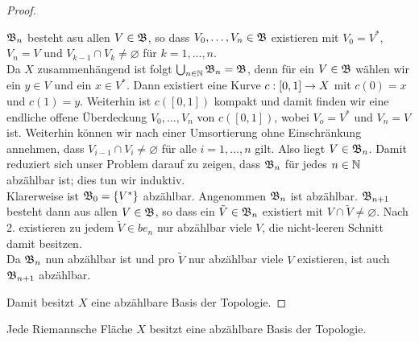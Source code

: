 \begin{proof}
\begin{enumerate}
    $\mathfrak{B}_n$ besteht asu allen $V \in \mathfrak{B}$, so dass $V_0, \dots, V_n
    \in \mathfrak{B}$ existieren mit $V_0 = V^\ast$, $V_n = V$ und $V_{k-1}
    \cap V_k \neq \varnothing$ für $k = 1, \dots, n$. \\
    Da $X$ zusammenhängend ist folgt $\bigcup_{n \in \mathbb{N}} \mathfrak{B}_n =
    \mathfrak{B}$, denn für ein $V \in \mathfrak{B}$ wählen wir ein $y \in V$ und ein $x
    \in V^\ast$. Dann existiert eine Kurve $c: [0,1] \rightarrow X$ mit $c(0)
    = x$ und $c(1) = y$. Weiterhin ist $c([0,1])$ kompakt und damit
    finden wir eine endliche offene Überdeckung $V_0, \dots, V_n$ von
    $c([0,1])$, wobei $V_o = V^\ast$ und $V_n = V$ ist. Weiterhin
    können wir nach einer Umsortierung ohne Einschränkung annehmen,
    dass $V_{i-1} \cap V_{i} \neq \varnothing$ für alle $i= 1, \dots,
    n$ gilt. Also liegt $V \in \mathfrak{B}_n$.
    Damit reduziert sich unser Problem darauf zu zeigen, dass $\mathfrak{B}_n$
    für jedes $n \in \mathbb{N}$ abzählbar ist; dies tun wir induktiv. \\
    Klarerweise ist $\mathfrak{B}_0 = \{V^\ast\}$ abzählbar. Angenommen $\mathfrak{B}_n$
    ist abzählbar. $\mathfrak{B}_{n+1}$ besteht dann aus allen $V \in \mathfrak{B}$, so
    dass ein $\tilde V \in \mathfrak{B}_n$ existiert mit $V \cap \tilde V \neq
    \varnothing$. Nach 2. existieren zu jedem $\tilde V \in be_n$ nur
    abzählbar viele $V$, die nicht-leeren Schnitt damit besitzen. \\
    Da $\mathfrak{B}_n$ nun abzählbar ist und pro $\tilde V$ nur abzählbar
    viele $V$ existieren, ist auch $\mathfrak{B}_{n+1}$ abzählbar.
  \end{enumerate}
  Damit besitzt $X$ eine abzählbare Basis der Topologie.
\end{proof}

\begin{thm}[Rado]
  Jede Riemannsche Fläche $X$ besitzt eine abzählbare Basis der
  Topologie.
  \label{thm:rado}
\end{thm}

